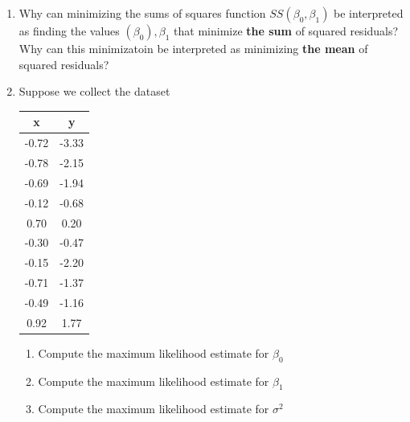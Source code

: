 \begin{enumerate}
    \item Why can minimizing the sums of squares function $SS(\beta_{0}, \beta_{1})$ be interpreted as finding the values $(\beta_{0}), \beta_{1}$ that minimize \textbf{the sum} of squared residuals? Why can this minimizatoin be interpreted as minimizing \textbf{the mean} of squared residuals?
    
    \item Suppose we collect the dataset
    \begin{table}[ht!]
        \centering
        \begin{tabular}{c|c}
            x & y \\
            \hline
            -0.72 &  -3.33\\
            -0.78 &  -2.15\\
            -0.69 &  -1.94\\
            -0.12 &  -0.68\\
             0.70 &  0.20\\
            -0.30 &  -0.47\\
            -0.15 &  -2.20\\
            -0.71 &  -1.37\\
            -0.49 &  -1.16\\
             0.92 &  1.77\\
        \end{tabular}
    \end{table}
    \begin{enumerate}
        \item Compute the maximum likelihood estimate for $\beta_{0}$
        \item Compute the maximum likelihood estimate for $\beta_{1}$
        \item Compute the maximum likelihood estimate for $\sigma^{2}$
    \end{enumerate}
    

\end{enumerate}
